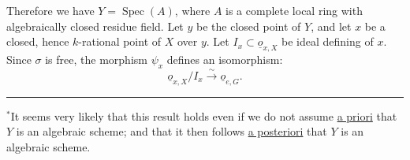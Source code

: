 Therefore we have $Y=\operatorname{Spec}(A)$, where $A$ is a complete local ring with algebraically closed residue field. Let $y$ be the closed point of $Y$, and let $x$ be a closed, hence $k$-rational point of $X$ over $y$. Let $I_x\subset\underline{o}_{x,X}$ be
ideal defining
of $x$. Since $\sigma$ is free, the morphism $\psi_x$ defines an isomorphism:
\[
\underline{o}_{x,X}/I_x\xrightarrow{\sim}\underline{o}_{e,G}.
\]

\noindent\rule{2cm}{.4pt}

${}^*$It seems very likely that this result holds even if we do not assume \uline{a priori} that $Y$ is an algebraic scheme; and that it then follows \uline{a posteriori} that $Y$ is an algebraic scheme.

